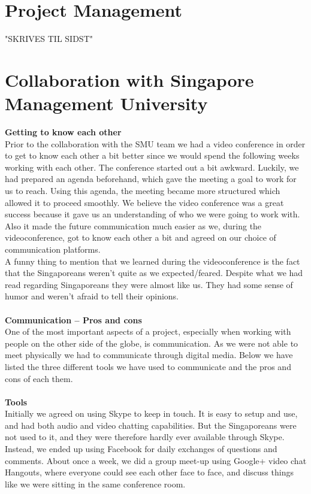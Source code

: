 \documentclass[10pt,a4paper]{article}
\begin{document}
\section{Project Management}
"SKRIVES TIL SIDST"
\section{Collaboration with Singapore Management University}

{\bfseries Getting to know each other}\\
Prior to the collaboration with the SMU team we had a video conference in order to get to know each other a bit better since we would spend the following weeks working with each other. The conference started out a bit awkward. Luckily, we had prepared an agenda beforehand, which gave the meeting a goal to work for us to reach. Using this agenda, the meeting became more structured which allowed it to proceed smoothly. We believe the video conference was a great success because it gave us an understanding of who we were going to work with. Also it made the future communication much easier as we, during the videoconference, got to know each other a bit and agreed on our choice of communication platforms.\\
A funny thing to mention that we learned during the videoconference is the fact that the Singaporeans weren’t quite as we expected/feared. Despite what we had read regarding Singaporeans they were almost like us. They had some sense of humor and weren’t afraid to tell their opinions. \\\\
{\bfseries Communication – Pros and cons}\\
One of the most important aspects of a project, especially when working with people on the other side of the globe, is communication. As we were not able to meet physically we had to communicate through digital media. Below we have listed the three different tools we have used to communicate and the pros and cons of each them. \\\\
{\bfseries Tools}\\
Initially we agreed on using Skype to keep in touch. It is easy to setup and use, and had both audio and video chatting capabilities. But the Singaporeans were not used to it, and they were therefore hardly ever available through Skype. Instead, we ended up using Facebook for daily exchanges of questions and comments. About once a week, we did a group meet-up using Google+ video chat Hangouts, where everyone could see each other face to face, and discuss things like we were sitting in the same conference room.\\\\
\end{document}
